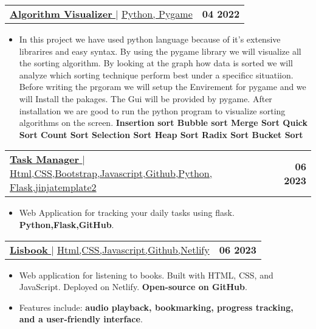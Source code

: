\documentclass[letterpaper,11pt]{article}
\makeatletter
\newcommand{\resumeItem}[1]{
  \item\small{
    {#1 \vspace{-2pt}}
  }
}
\newcommand{\resumeProjectHeading}[2]{
    \item
    \begin{tabular*}{1.001\textwidth}{l@{\extracolsep{\fill}}r}
      \small#1 & \textbf{\small #2}\\
    \end{tabular*}\vspace{-7pt}
}
\newcommand{\resumeItemListStart}{\begin{itemize}}
\newcommand{\resumeItemListEnd}{\end{itemize}\vspace{-5pt}}
\makeatother
\begin{document}
          \resumeProjectHeading
          {\href{https://github.com/Ctoic/Algorithm-Visualizer-Using-pygame}{\textbf{\large{\underline{Algorithm Visualizer}}} \href{https://github.com/Ctoic/Algorithm-Visualizer-Using-pygame}{\raisebox{-0.1\height}\faExternalLink }} $|$ \large{\underline{Python, Pygame}}}{04 2022}
          \resumeItemListStart
            \resumeItem{\normalsize{In this project we have used python language because of it's extensive librarires and easy syntax. By using the pygame library we will visualize all the sorting algorithm. By looking at the graph how data is sorted we will analyze which sorting technique perform best under a specificc situatiion. Before writing the prgoram we will setup the Envirement for pygame and we will Install the pakages. The Gui will be provided by pygame. After installation we are good to run the python program to visualize sorting algorithms on the screen. \textbf{Insertion sort
            Bubble sort
            Merge Sort
            Quick Sort
            Count Sort
            Selection Sort
            Heap Sort
            Radix Sort
            Bucket Sort} }}
           
          \resumeItemListEnd

          \resumeProjectHeading
          {\href{ProjectLink.com}{\textbf{\large{\underline{Task Manager}}} \href{https://github.com/Ctoic/Task-Manager.git}{\raisebox{-0.1\height}\faExternalLink }} $|$ \large{\underline{Html,CSS,Bootstrap,Javascript,Github,Python, Flask,jinjatemplate2}}}{06 2023}
          \resumeItemListStart
            \resumeItem{\normalsize{ Web Application for tracking your daily tasks using flask. \textbf{Python,Flask,GitHub}.}}

          \resumeItemListEnd
          \vspace{-4pt}

          \resumeProjectHeading
          {\href{https://lisbook.netlify.app/}{\textbf{\large{\underline{Lisbook}}} \href{https://github.com/Ctoic/Lisbook}{\raisebox{-0.1\height}\faExternalLink }} $|$ \large{\underline{Html,CSS,Javascript,Github,Netlify}}}{06 2023}
          \resumeItemListStart
            \resumeItem{\normalsize{ Web application for listening to books. Built with HTML, CSS, and JavaScript. Deployed on Netlify. \textbf{Open-source on GitHub}.}}
            \resumeItem{\normalsize{ Features include: \textbf{audio playback, bookmarking, progress tracking, and a user-friendly interface}.}}
          \resumeItemListEnd
          \vspace{-13pt}
 
\end{document}
